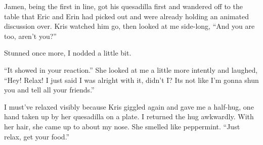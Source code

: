 Jamen, being the first in line, got his quesadilla first and wandered off to the table that Eric and Erin had picked out and were already holding an animated discussion over.  Kris watched him go, then looked at me side-long, ``And you are too, aren't you?''

Stunned once more, I nodded a little bit.

``It showed in your reaction.''  She looked at me a little more intently and laughed, ``Hey!  Relax!  I just said I was alright with it, didn't I?  Its not like I'm gonna shun you and tell all your friends.''

I must've relaxed visibly because Kris giggled again and gave me a half-hug, one hand taken up by her quesadilla on a plate.  I returned the hug awkwardly.  With her hair, she came up to about my nose.  She smelled like peppermint.  ``Just relax, get your food.''
